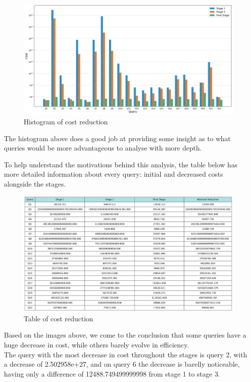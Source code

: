 \documentclass[a4paper,12pt]{scrreprt}
\begin{document}
\begin{figure}[H]
    \includegraphics[width = 1.35\textwidth, height = 0.37\textheight, keepaspectratio]{img_cost_differential/cost_reduction_all_queries.png}
    \caption{Histogram of cost reduction}
    \label{fig:cost1}
\end{figure}

The histogram above does a good job at providing some insight as to what queries would be more advantageous to analyse with more depth. 

To help understand the motivations behind this analysis, the table below has more detailed information about every query: initial and decreased costs alongside the stages.

\begin{figure}[H]
    \includegraphics[width = 1.45\textwidth, height = 0.40\textheight, keepaspectratio]{img_cost_differential/cost_reduction_table.png}
    \caption{Table of cost reduction}
    \label{fig:tab1}
\end{figure}

Based on the images above, we come to the conclusion that some queries have a huge decrease in cost, while others barely evolve in efficiency. \\
The query with the most decrease in cost throughout the stages is query 2, with a decrease of 2.502958e+27, and on query 6 the decrease is barelly noticeable, having only a difference of 12488.749499999998 from stage 1 to stage 3. 
\end{document}
